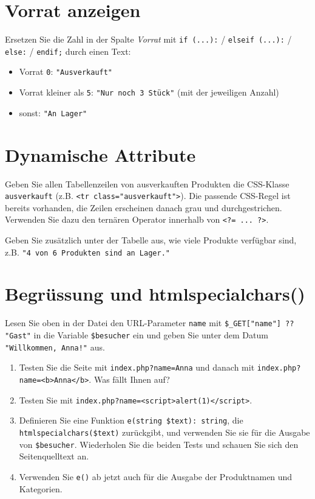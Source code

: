 \documentclass[a4paper,12pt]{article}
\begin{document}
\section{Vorrat anzeigen}

Ersetzen Sie die Zahl in der Spalte \emph{Vorrat} mit \texttt{if (...):} / \texttt{elseif (...):} / \texttt{else:} / \texttt{endif;} durch einen Text:

\begin{itemize}
    \item Vorrat \texttt{0}: \texttt{"{}Ausverkauft"{}}
    \item Vorrat kleiner als \texttt{5}: \texttt{"{}Nur noch 3 Stück"{}} (mit der jeweiligen Anzahl)
    \item sonst: \texttt{"{}An Lager"{}}
\end{itemize}

\section{Dynamische Attribute}

Geben Sie allen Tabellenzeilen von ausverkauften Produkten die CSS-Klasse \texttt{ausverkauft} (z.B. \texttt{<tr class="{}ausverkauft"{}>}). Die passende CSS-Regel ist bereits vorhanden, die Zeilen erscheinen danach grau und durchgestrichen. Verwenden Sie dazu den ternären Operator innerhalb von \texttt{<?= ... ?>}.

Geben Sie zusätzlich unter der Tabelle aus, wie viele Produkte verfügbar sind, z.B. \texttt{"{}4 von 6 Produkten sind an Lager."{}}

\section{Begrüssung und htmlspecialchars()}

Lesen Sie oben in der Datei den URL-Parameter \texttt{name} mit \texttt{\$\_GET["{}name"{}] ?? "{}Gast"{}} in die Variable \texttt{\$besucher} ein und geben Sie unter dem Datum \texttt{"{}Willkommen, Anna!"{}} aus.

\begin{enumerate}
    \item Testen Sie die Seite mit \texttt{index.php?name=Anna} und danach mit \texttt{index.php?name=<b>Anna</b>}. Was fällt Ihnen auf?
    \item Testen Sie mit \texttt{index.php?name=<script>alert(1)</script>}.
    \item Definieren Sie eine Funktion \texttt{e(string \$text): string}, die \texttt{htmlspecialchars(\$text)} zurückgibt, und verwenden Sie sie für die Ausgabe von \texttt{\$besucher}. Wiederholen Sie die beiden Tests und schauen Sie sich den Seitenquelltext an.
    \item Verwenden Sie \texttt{e()} ab jetzt auch für die Ausgabe der Produktnamen und Kategorien.
\end{enumerate}
\end{document}
